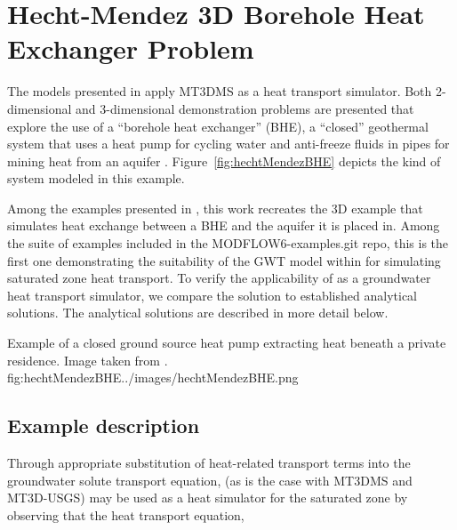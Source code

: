 \section{Hecht-Mendez 3D Borehole Heat Exchanger Problem}

The models presented in \cite{hechtMendez2010} apply MT3DMS \citep{zheng1999mt3dms} as a heat transport simulator.  Both 2-dimensional and 3-dimensional demonstration problems are presented that explore the use of a ``borehole heat exchanger'' (BHE), a ``closed'' geothermal system that uses a heat pump for cycling water and anti-freeze fluids in pipes for mining heat from an aquifer \citep{diao2004}.  Figure~\ref{fig:hechtMendezBHE} depicts the kind of system modeled in this example.

Among the examples presented in \cite{hechtMendez2010}, this work recreates the 3D example that simulates heat exchange between a BHE and the aquifer it is placed in.  Among the suite of examples included in the MODFLOW6-examples.git repo, this is the first one demonstrating the suitability of the GWT model within \mf for simulating saturated zone heat transport.  To verify the applicability of  as a groundwater heat transport simulator, we compare the \mf solution to established analytical solutions.  The analytical solutions are described in more detail below.

\begin{StandardFigure}{
                                     Example of a closed ground source heat pump extracting heat beneath a private residence.  Image taken from \cite{hecht2008}.
                                     }{fig:hechtMendezBHE}{../images/hechtMendezBHE.png}
\end{StandardFigure}

\subsection{Example description}

Through appropriate substitution of heat-related transport terms into the groundwater solute transport equation, \mf (as is the case with MT3DMS and MT3D-USGS) may be used as a heat simulator for the saturated zone by observing that the heat transport equation,
